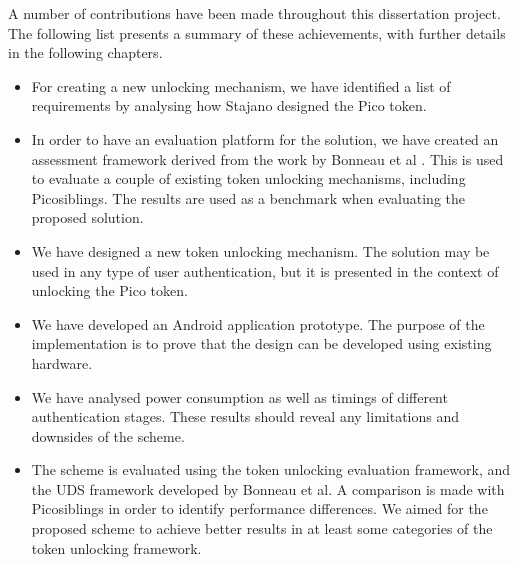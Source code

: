 A number of contributions have been made throughout this dissertation project. The following list presents a summary of these achievements, with further details in the following chapters.
\begin{itemize}
	\item For creating a new unlocking mechanism, we have identified a list of requirements by analysing how Stajano \cite{stajano2011pico} designed the Pico token.

	\item In order to have an evaluation platform for the solution, we have created an assessment framework derived from the work by Bonneau et al \cite{bonneau2012quest}. This is used to evaluate a couple of existing token unlocking mechanisms, including Picosiblings. The results are used as a benchmark when evaluating the proposed solution.
	
	\item We have designed a new token unlocking mechanism. The solution may be used in any type of user authentication, but it is presented in the context of unlocking the Pico token. 
	
	\item We have developed an Android application prototype. The purpose of the implementation is to prove that the design can be developed using existing hardware. 
	
	\item We have analysed power consumption as well as timings of different authentication stages. These results should reveal any limitations and downsides of the scheme.
	
	\item The scheme is evaluated using the token unlocking evaluation framework, and the UDS framework developed by Bonneau et al. A comparison is made with Picosiblings in order to identify performance differences. We aimed for the proposed scheme to achieve better results in at least some categories of the token unlocking framework.
	
\end{itemize}	
